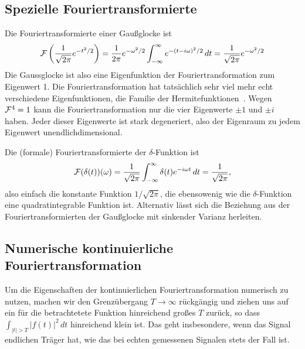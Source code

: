 \subsection{Spezielle Fouriertransformierte}

Die Fouriertransformierte einer Gaußglocke ist
\begin{equation}
  \mathcal F\left(\frac{1}{\sqrt{2\pi}}e^{-t^2/2}\right)
  =
  \frac{1}{2\pi}e^{-\omega^2/2}\int_{-\infty}^{\infty} e^{-(t-i\omega)^2/2}\, dt
  =
  \frac{1}{\sqrt{2\pi}}e^{-\omega^2/2}
\end{equation}
Die Gaussglocke ist also eine Eigenfunktion der Fouriertransformation
zum Eigenwert 1. Die Fouriertransformation hat tatsächlich sehr viel
mehr echt verschiedene Eigenfunktionen, die Familie der
Hermitefunktionen~\cite{pinsky02a}. Wegen $\mathcal F^4=1$ kann die
Fouriertransformation nur die vier Eigenwerte $\pm 1$ und $\pm i$
haben. Jeder dieser Eigenwerte ist stark degeneriert, also der
Eigenraum zu jedem Eigenwert unendlichdimensional.

Die (formale) Fouriertransformierte der $\delta$-Funktion ist
\begin{equation}
  \label{eq:fourierdelta}
  \mathcal F(\delta(t))(\omega)
  =
  \frac{1}{\sqrt{2\pi}}\int_{-\infty}^{\infty}
  \delta(t)e^{-i \omega t}\, dt = \frac{1}{\sqrt{2\pi}},
\end{equation}
also einfach die konstante Funktion $1/\sqrt{2\pi}$, die ebensowenig
wie die $\delta$-Funktion eine quadratintegrable Funktion
ist. Alternativ lässt sich die Beziehung aus der
Fouriertransformierten der Gaußglocke mit sinkender Varianz herleiten.

\subsection{Numerische kontinuierliche Fouriertransformation}
\label{sec:contdft}

Um die Eigenschaften der kontinuierlichen Fouriertransformation
numerisch zu nutzen, machen wir den Grenzübergang $T\to\infty$
rückgängig und ziehen uns auf ein für die betrachtetete Funktion
hinreichend großes $T$ zurück, so dass $\int_{\lvert t\rvert>T}\lvert
f(t)\rvert^2\, dt$ hinreichend klein ist. Das geht insbesondere, wenn
das Signal endlichen Träger hat, wie das bei echten gemessenen
Signalen stets der Fall ist.

